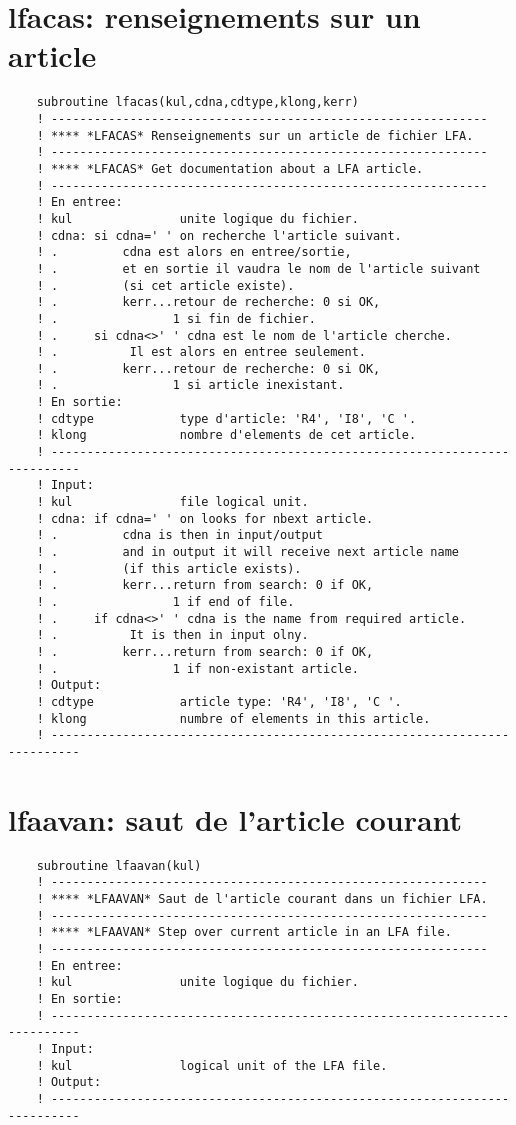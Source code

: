 \documentclass[10pt,french]{book}
\begin{document}
\section{lfacas: renseignements sur un article}
\begin{verbatim}
	subroutine lfacas(kul,cdna,cdtype,klong,kerr)
	! -------------------------------------------------------------                
	! **** *LFACAS* Renseignements sur un article de fichier LFA.
	! -------------------------------------------------------------                
	! **** *LFACAS* Get documentation about a LFA article.
	! -------------------------------------------------------------                
	! En entree:
	! kul               unite logique du fichier.
	! cdna: si cdna=' ' on recherche l'article suivant.
	! .         cdna est alors en entree/sortie,
	! .         et en sortie il vaudra le nom de l'article suivant
	! .         (si cet article existe).
	! .         kerr...retour de recherche: 0 si OK,
	! .                1 si fin de fichier.
	! .     si cdna<>' ' cdna est le nom de l'article cherche.
	! .          Il est alors en entree seulement.
	! .         kerr...retour de recherche: 0 si OK,
	! .                1 si article inexistant.
	! En sortie:
	! cdtype            type d'article: 'R4', 'I8', 'C '.
	! klong             nombre d'elements de cet article.
	! --------------------------------------------------------------------------
	! Input:
	! kul               file logical unit.
	! cdna: if cdna=' ' on looks for nbext article.
	! .         cdna is then in input/output
	! .         and in output it will receive next article name
	! .         (if this article exists).
	! .         kerr...return from search: 0 if OK,
	! .                1 if end of file.
	! .     if cdna<>' ' cdna is the name from required article.
	! .          It is then in input olny.
	! .         kerr...return from search: 0 if OK,
	! .                1 if non-existant article.
	! Output:
	! cdtype            article type: 'R4', 'I8', 'C '.
	! klong             numbre of elements in this article.
	! --------------------------------------------------------------------------
\end{verbatim}
\section{lfaavan: saut de l'article courant}
 
 
\begin{verbatim}
	subroutine lfaavan(kul)
	! -------------------------------------------------------------                
	! **** *LFAAVAN* Saut de l'article courant dans un fichier LFA.
	! -------------------------------------------------------------                
	! **** *LFAAVAN* Step over current article in an LFA file.
	! -------------------------------------------------------------                
	! En entree:
	! kul               unite logique du fichier.
	! En sortie:
	! --------------------------------------------------------------------------
	! Input:
	! kul               logical unit of the LFA file.
	! Output:
	! --------------------------------------------------------------------------
\end{verbatim}
\end{document}
